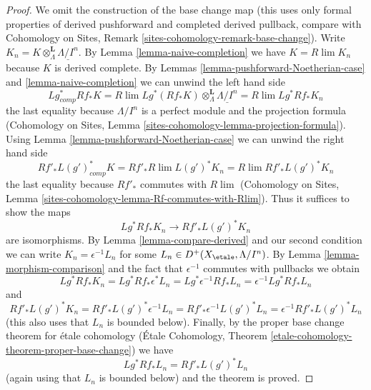 \begin{proof}
We omit the construction of the base change map (this uses only
formal properties of derived pushforward and completed derived pullback,
compare with
Cohomology on Sites, Remark \ref{sites-cohomology-remark-base-change}).
Write $K_n = K \otimes^\mathbf{L}_\Lambda \underline{\Lambda/I^n}$.
By Lemma \ref{lemma-naive-completion} we have $K = R\lim K_n$
because $K$ is derived complete.
By Lemmas \ref{lemma-pushforward-Noetherian-case} and
\ref{lemma-naive-completion} we can unwind the left hand side
$$
Lg_{comp}^* Rf_* K =
R\lim Lg^*(Rf_*K)\otimes^\mathbf{L}_\Lambda \underline{\Lambda/I^n} =
R\lim Lg^* Rf_* K_n
$$
the last equality because $\Lambda/I^n$ is a perfect module and
the projection formula (Cohomology on Sites, Lemma
\ref{sites-cohomology-lemma-projection-formula}).
Using Lemma \ref{lemma-pushforward-Noetherian-case} we can unwind the right
hand side
$$
Rf'_* L(g')^*_{comp} K =
Rf'_* R\lim L(g')^* K_n  =
R\lim Rf'_* L(g')^* K_n
$$
the last equality because $Rf'_*$ commutes with $R\lim$
(Cohomology on Sites, Lemma
\ref{sites-cohomology-lemma-Rf-commutes-with-Rlim}).
Thus it suffices to show the maps
$$
Lg^* Rf_* K_n \longrightarrow Rf'_* L(g')^* K_n
$$
are isomorphisms. By Lemma \ref{lemma-compare-derived} and our second
condition we can write $K_n = \epsilon^{-1}L_n$ for some
$L_n \in D^+(X_\etale, \Lambda/I^n)$. By Lemma \ref{lemma-morphism-comparison}
and the fact that $\epsilon^{-1}$ commutes with pullbacks
we obtain
$$
Lg^* Rf_* K_n =
Lg^* Rf_* \epsilon^*L_n =
Lg^* \epsilon^{-1} Rf_* L_n =
\epsilon^{-1} Lg^* Rf_* L_n
$$
and
$$
Rf'_* L(g')^* K_n =
Rf'_* L(g')^* \epsilon^{-1} L_n =
Rf'_* \epsilon^{-1} L(g')^* L_n =
\epsilon^{-1} Rf'_* L(g')^* L_n
$$
(this also uses that $L_n$ is bounded below).
Finally, by the proper base change theorem for \'etale cohomology
(\'Etale Cohomology, Theorem
\ref{etale-cohomology-theorem-proper-base-change}) we have
$$
Lg^* Rf_* L_n = Rf'_* L(g')^* L_n
$$
(again using that $L_n$ is bounded below)
and the theorem is proved.
\end{proof}
















